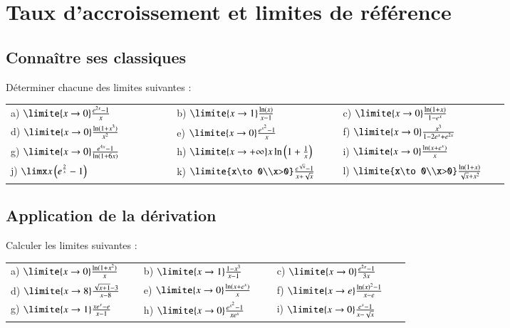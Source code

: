\documentclass[oneside,12pt]{article}          %
\begin{document}
 
\section{Taux d'accroissement et limites de référence}

\subsection{Connaître ses classiques}
Déterminer chacune des limites suivantes :

\begin{tabular}{p{0.3\linewidth}p{0.3\linewidth}p{0.3\linewidth}}
    a) $\limite{x\to0} \frac{e^{2x}-1}{x}$ & b) $\limite{x\to1}\frac{\ln(x)}{x-1}$ & c) $\limite{x\to0}\frac{\ln(1+x)}{1-e^x}$ \\
    d) $\limite{x\to0}\frac{\ln(1+x^3)}{x^2}$ & e) $\limite{x\to0}\frac{e^{x^2}-1}{x}$ & f) $\limite{x\to0}\frac{x^3}{1-2e^x+e^{2x}}$ \\
    g) $\limite{x\to0}\frac{e^{4x}-1}{\ln(1+6x)}$ & h) $\limite{x\to+\infty}x\ln\left(1+\frac{1}{x}\right)$ & i) $\limite{x\to0}\frac{\ln(x+e^x)}{x}$ \\
    j) $\limx x\left(e^\frac{2}{x}-1\right)$ & k) $\limite{x\to0\\x>0}\frac{e^{\sqrt{x}}-1}{x+\sqrt{x}}$ & l) $\limite{x\to0\\x>0} \frac{\ln(1+x)}{\sqrt{x}+x^2}$
\end{tabular}



\subsection{Application de la dérivation}
Calculer les limites suivantes :

\begin{tabular}{p{0.3\linewidth} p{0.3\linewidth} p{0.3\linewidth}}
    a) $\limite{x\to0}\frac{\ln(1+x^2)}{x}$ & b) $\limite{x\to1}\frac{1-x^3}{x-1}$ & c) $\limite{x\to0}\frac{e^{2x}-1}{3x}$ \\ 
    d) $\limite{x\to8}\frac{\sqrt{x+1}-3}{x-8}$ & e) $\limite{x\to0}\frac{\ln(x+e^x)}{x}$ & f) $\limite{x\to e}\frac{\ln(x)^2-1}{x-e}$ \\
    g) $\limite{x\to1}\frac{xe^x-e}{x-1}$ & h) $\limite{x\to0}\frac{e^{x^2}-1}{xe^x}$ & i) $\limite{x\to0}\frac{e^x-1}{x-\sqrt{x}}$ \\
\end{tabular}
\end{document}
